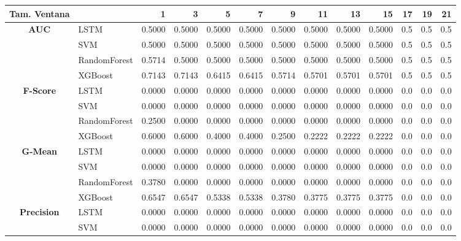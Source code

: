 \begin{table}[h]
	\centering
	\begin{adjustbox}{max width=15cm}
		\begin{tabular}{|c|l|r|r|r|r|r|r|r|r|r|r|r|}
			\hline
			\textbf{Tam. Ventana}&         &      1  &      3  &      5  &      7  &      9  &      11 &      13 &      15 &   17 &   19 &   21 \\
			\hline
			\textbf{AUC} & LSTM &  0.5000 &  0.5000 &  0.5000 &  0.5000 &  0.5000 &  0.5000 &  0.5000 &  0.5000 &  0.5 &  0.5 &  0.5 \\
			& SVM &  0.5000 &  0.5000 &  0.5000 &  0.5000 &  0.5000 &  0.5000 &  0.5000 &  0.5000 &  0.5 &  0.5 &  0.5 \\
			& RandomForest &  0.5714 &  0.5000 &  0.5000 &  0.5000 &  0.5000 &  0.5000 &  0.5000 &  0.5000 &  0.5 &  0.5 &  0.5 \\
			& XGBoost &  0.7143 &  0.7143 &  0.6415 &  0.6415 &  0.5714 &  0.5701 &  0.5701 &  0.5701 &  0.5 &  0.5 &  0.5 \\
			\hline
			\textbf{F-Score} & LSTM &  0.0000 &  0.0000 &  0.0000 &  0.0000 &  0.0000 &  0.0000 &  0.0000 &  0.0000 &  0.0 &  0.0 &  0.0 \\
			& SVM &  0.0000 &  0.0000 &  0.0000 &  0.0000 &  0.0000 &  0.0000 &  0.0000 &  0.0000 &  0.0 &  0.0 &  0.0 \\
			& RandomForest &  0.2500 &  0.0000 &  0.0000 &  0.0000 &  0.0000 &  0.0000 &  0.0000 &  0.0000 &  0.0 &  0.0 &  0.0 \\
			& XGBoost &  0.6000 &  0.6000 &  0.4000 &  0.4000 &  0.2500 &  0.2222 &  0.2222 &  0.2222 &  0.0 &  0.0 &  0.0 \\
			\hline
			\textbf{G-Mean} & LSTM &  0.0000 &  0.0000 &  0.0000 &  0.0000 &  0.0000 &  0.0000 &  0.0000 &  0.0000 &  0.0 &  0.0 &  0.0 \\
			& SVM &  0.0000 &  0.0000 &  0.0000 &  0.0000 &  0.0000 &  0.0000 &  0.0000 &  0.0000 &  0.0 &  0.0 &  0.0 \\
			& RandomForest &  0.3780 &  0.0000 &  0.0000 &  0.0000 &  0.0000 &  0.0000 &  0.0000 &  0.0000 &  0.0 &  0.0 &  0.0 \\
			& XGBoost &  0.6547 &  0.6547 &  0.5338 &  0.5338 &  0.3780 &  0.3775 &  0.3775 &  0.3775 &  0.0 &  0.0 &  0.0 \\
			\hline
			\textbf{Precision} & LSTM &  0.0000 &  0.0000 &  0.0000 &  0.0000 &  0.0000 &  0.0000 &  0.0000 &  0.0000 &  0.0 &  0.0 &  0.0 \\
			& SVM &  0.0000 &  0.0000 &  0.0000 &  0.0000 &  0.0000 &  0.0000 &  0.0000 &  0.0000 &  0.0 &  0.0 &  0.0 \\

\end{tabular}
\end{adjustbox}
\end{table}
